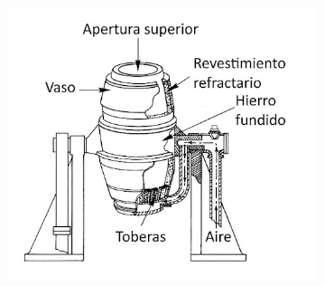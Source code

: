 \documentclass[12pt,a4paper]{article}
\begin{document}
 \begin{figure}[h!]
    \centering
    \begin{subfigure}{0.45\textwidth}
        \centering
        \includegraphics[width=\textwidth]{Inagenes para latex/convertidor baser.png}
        \label{bessemer}


\end{subfigure}
\end{figure}
\end{document}
